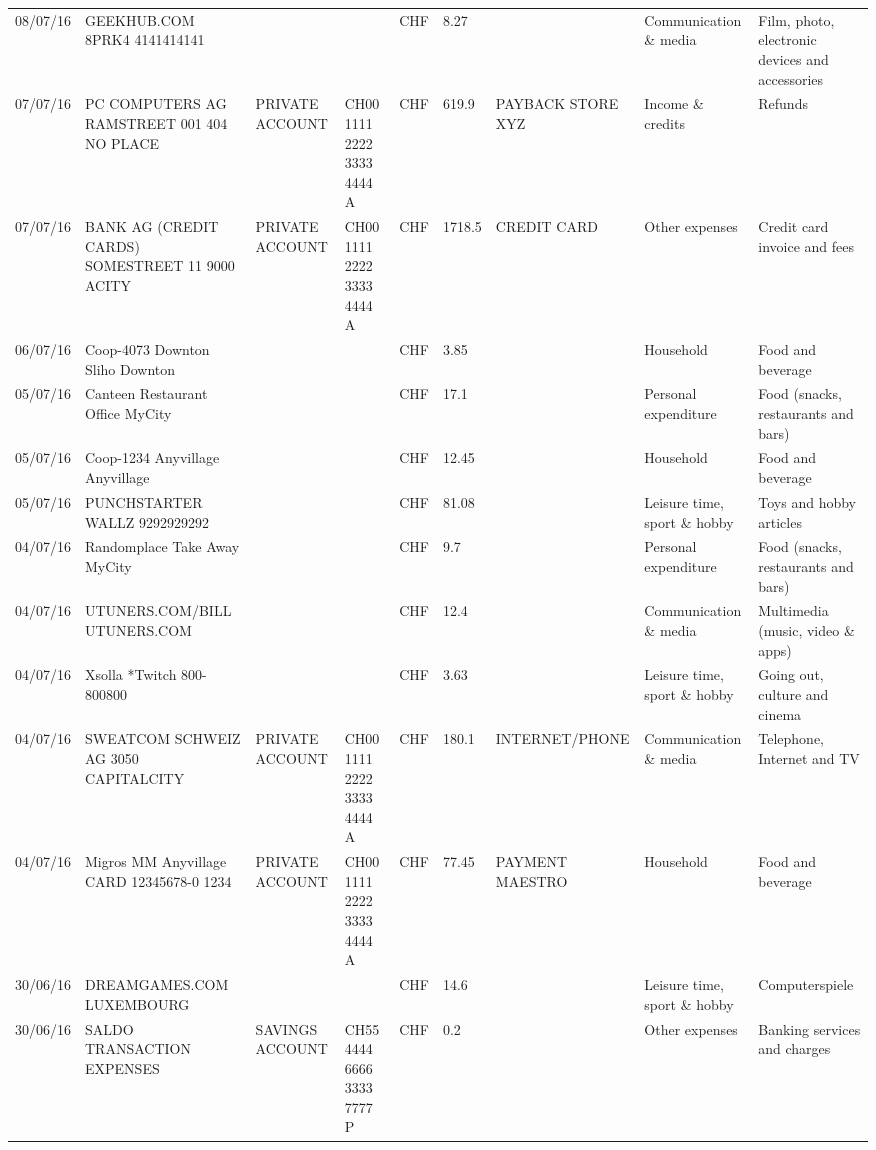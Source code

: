 \begin{landscape}
\begin{table}[t]
\begin{center}
\begin{tabular}{lllllllll}
		08/07/16 & GEEKHUB.COM  8PRK4        4141414141 &       &       & CHF   & 8.27  &       & Communication \& media & Film, photo, electronic devices and accessories \\
		07/07/16 & PC COMPUTERS AG RAMSTREET 001 404 NO PLACE & PRIVATE ACCOUNT & CH00 1111 2222 3333 4444 A & CHF   & 619.9 & PAYBACK STORE XYZ & Income \& credits & Refunds \\
		07/07/16 & BANK AG (CREDIT CARDS) SOMESTREET 11 9000 ACITY & PRIVATE ACCOUNT & CH00 1111 2222 3333 4444 A & CHF   & 1718.5 & CREDIT CARD & Other expenses & Credit card invoice and fees \\
		06/07/16 & Coop-4073 Downton Sliho   Downton &       &       & CHF   & 3.85  &       & Household & Food and beverage \\
		05/07/16 & Canteen Restaurant Office      MyCity &       &       & CHF   & 17.1  &       & Personal expenditure & Food (snacks, restaurants and bars) \\
		05/07/16 & Coop-1234 Anyvillage    Anyvillage &       &       & CHF   & 12.45 &       & Household & Food and beverage \\
		05/07/16 & PUNCHSTARTER WALLZ   9292929292 &       &       & CHF   & 81.08 &       & Leisure time, sport \& hobby & Toys and hobby articles \\
		04/07/16 & Randomplace Take Away     MyCity &       &       & CHF   & 9.7   &       & Personal expenditure & Food (snacks, restaurants and bars) \\
		04/07/16 & UTUNERS.COM/BILL          UTUNERS.COM &       &       & CHF   & 12.4  &       & Communication \& media & Multimedia (music, video \& apps) \\
		04/07/16 & Xsolla *Twitch           800-800800 &       &       & CHF   & 3.63  &       & Leisure time, sport \& hobby & Going out, culture and cinema \\
		04/07/16 & SWEATCOM SCHWEIZ AG 3050 CAPITALCITY & PRIVATE ACCOUNT & CH00 1111 2222 3333 4444 A & CHF   & 180.1 & INTERNET/PHONE & Communication \& media & Telephone,  Internet and TV \\
		04/07/16 & Migros MM Anyvillage CARD 12345678-0 1234 & PRIVATE ACCOUNT & CH00 1111 2222 3333 4444 A & CHF   & 77.45 & PAYMENT MAESTRO & Household & Food and beverage \\
		30/06/16 & DREAMGAMES.COM           LUXEMBOURG &       &       & CHF   & 14.6  &       & Leisure time, sport \& hobby & Computerspiele \\
		30/06/16 & SALDO TRANSACTION EXPENSES & SAVINGS ACCOUNT & CH55 4444 6666 3333 7777 P & CHF   & 0.2   &       & Other expenses & Banking services and charges \\

\end{tabular}
\end{center}
\end{table}
\end{landscape}
